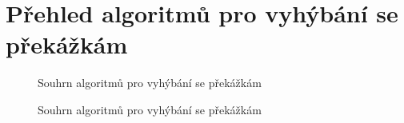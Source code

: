 \documentclass[twoside]{ctuthesis}
\theoremstyle{plain}
\theoremstyle{definition}
\theoremstyle{note}
\begin{document}
\chapter{Přehled algoritmů pro vyhýbání se překážkám}
\label{obstacle_avoidance}
\begin{figure}[H]
	\caption{Souhrn algoritmů pro vyhýbání se překážkám \cite[s. 287--290]{cite:20}}
	\label{korelace}
	\newline
\end{figure}
\begin{figure}[H]\ContinuedFloat
		\caption{Souhrn algoritmů pro vyhýbání se překážkám \cite[s. 287--290]{cite:20}}
	\newline
\end{figure}
\end{document}

